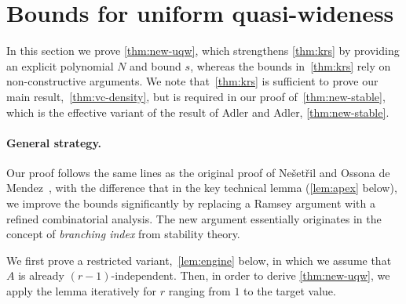 \section{Bounds for uniform quasi-wideness}\label{sec:uqw}



In this section we prove \cref{thm:new-uqw}, which strengthens \cref{thm:krs} by providing an explicit polynomial $N$ and bound $s$,
whereas the bounds in~\cref{thm:krs} rely on non-constructive arguments. 
We note that~\cref{thm:krs} is sufficient to prove our main result,~\cref{thm:vc-density}, but is required in our proof of~\cref{thm:new-stable}, which is the effective 
variant of the result of Adler and Adler, \cref{thm:new-stable}.

%



\paragraph{General strategy.}
Our proof follows the same lines as the original proof of Ne\v set\v ril and Ossona de Mendez~\cite{nevsetvril2011nowhere}, with the difference that in the key technical lemma (\cref{lem:apex} below), 
we improve the bounds significantly by replacing a Ramsey argument with a refined combinatorial analysis.
The new argument essentially originates in the concept of {\em{branching index}} from stability theory. 

We first prove a restricted variant,~\cref{lem:engine} below, in which we assume that $A$ is already $(r-1)$-independent. Then, in order to derive
\cref{thm:new-uqw}, we apply the lemma iteratively for $r$ ranging from $1$ to the target value.

